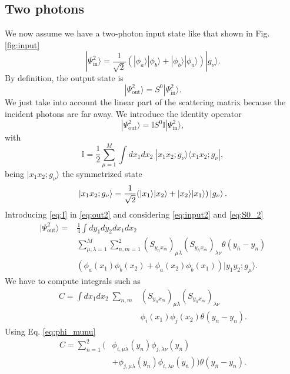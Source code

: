 \documentclass[notitlepage, prx, preprint, amsmath,superscriptaddress,amssymb]{revtex4-1}
\begin{document}
\subsection{Two photons}

We now assume we have a two-photon input state like that shown in Fig. \ref{fig:input}
\begin{equation}\label{eq:input2}
|\Psi_\text{in}^2\rangle = \frac{1}{\sqrt{2}}(|\phi_a\rangle|\phi_b\rangle+|\phi_b\rangle|\phi_a\rangle)|g_\nu\rangle.
\end{equation}
By definition, the output state is
\begin{equation}
|\Psi_\text{out}^2\rangle = S^0|\Psi_\text{in}^2\rangle.
\end{equation}
We just take into account the linear part of the scattering matrix because the incident photons are far away. We introduce the identity operator
\begin{equation}\label{eq:out2}
|\Psi_\text{out}^2\rangle = \mathbb{I}S^0\mathbb{I}|\Psi_\text{in}^2\rangle,
\end{equation}
with
\begin{equation}\label{eq:I}
\mathbb{I}=\frac{1}{2}\sum_{\mu=1}^M \int dx_1dx_2\;|x_1x_2;g_\nu\rangle \langle x_1x_2;g_\nu|,
\end{equation}
being $|x_1x_2;g_\nu\rangle$ the symmetrized state
\begin{equation}
|x_1x_2;g_\nu\rangle=\frac{1}{\sqrt{2}}(|x_1\rangle|x_2\rangle + |x_2\rangle|x_1\rangle) \ket{g_\nu}.
\end{equation}
Introducing \eqref{eq:I} in \eqref{eq:out2} and considering \eqref{eq:input2} and \eqref{eq:S0_2}
\begin{align}\label{eq:out2_2}
|\Psi_\text{out}^2\rangle = &\frac{1}{4}\int dy_1dy_2dx_1dx_2\nonumber\\
&\sum_{\mu,\lambda=1}^M\sum_{n,m=1}^2(S_{y_nx_m})_{\mu\lambda} (S_{y_{\overline{n}}x_{\overline{m}}})_{\lambda\nu}\theta(y_{\overline{n}}-y_n)\nonumber\\
&(\phi_a(x_1)\phi_b(x_2)+\phi_a(x_2)\phi_b(x_1))|y_1y_2;g_\mu\rangle.
\end{align}
We have to compute integrals such as
\begin{align}
C=\int dx_1dx_2\;\sum_{n,m}&(S_{y_nx_m})_{\mu\lambda} (S_{y_{\overline{n}}x_{\overline{m}}})_{\lambda\nu}\nonumber\\
&\phi_i(x_1)\phi_j(x_2)\theta(y_{\overline{n}}-y_n).
\end{align}
Using Eq. \eqref{eq:phi_munu}
\begin{align}\label{eq:C1}
C=\sum_{n=1}^2(&\phi_{i,\mu\lambda}(y_n)\phi_{j,\lambda\nu}(y_{\overline{n}}) \nonumber\\
& + \phi_{j,\mu\lambda}(y_n)\phi_{i,\lambda\nu}(y_{\overline{n}}))\theta(y_{\overline{n}}-y_n).
\end{align}
\end{document}
